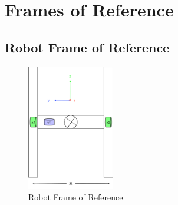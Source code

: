 
\def\mytitle{Guidance, Navigation, and Control Concept}
\def\myauthor{}
\def\mydate{}


\section{Frames of Reference}
\label{framesofreference}

\subsection{Robot Frame of Reference}
\label{robotframeofreference}

\begin{figure}[htbp]
\centering
\includegraphics[keepaspectratio,width=1.5in,height=0.75\textheight]{robot_frame}
\caption{Robot Frame of Reference}
\label{robot_frame}
\end{figure}

